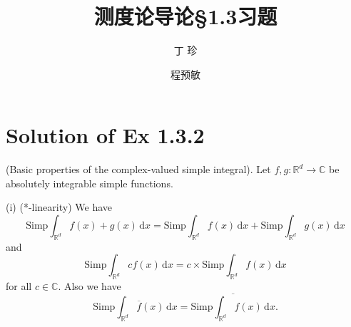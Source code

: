 \documentclass[reqno,a4paper,14pt]{amsart}
\title{\textbf{测度论导论\S1.3习题}}
\author{丁\;\;\; 珍}
\author{程预敏}
\newcommand\dif{\,\mathrm{d}}
\begin{document}
\maketitle


\section{Solution of Ex 1.3.2}
(Basic properties of the complex-valued simple integral). Let $f,g: \mathbb{R}^d\to \mathbb{C}$ be absolutely integrable simple functions.

(i) (*-linearity) We have 
\begin{equation}
    \mathrm{Simp}\int_{\mathbb{R}^d} f(x)+g(x)\dif x= \mathrm{Simp}\int_{\mathbb{R}^d} f(x)\dif x+\mathrm{Simp}\int_{\mathbb{R}^d} g(x)\dif x
    \label{additivity}
\end{equation}
and 
\begin{equation}
    \mathrm{Simp}\int_{\mathbb{R}^d} c f(x)\dif x=c\times\mathrm{Simp} \int_{\mathbb{R}^d} f(x)\dif x
    \label{dot_multi}
\end{equation}
for all $c\in \mathbb{C}$. Also we have 
\begin{equation}
    \mathrm{Simp} \int_{\mathbb{R}^d} \overline{f}(x)\dif x=\overline{\mathrm{Simp}\int_{\mathbb{R}^d} f(x)\dif x}.
    \label{conjugation}
\end{equation}
\end{document}

